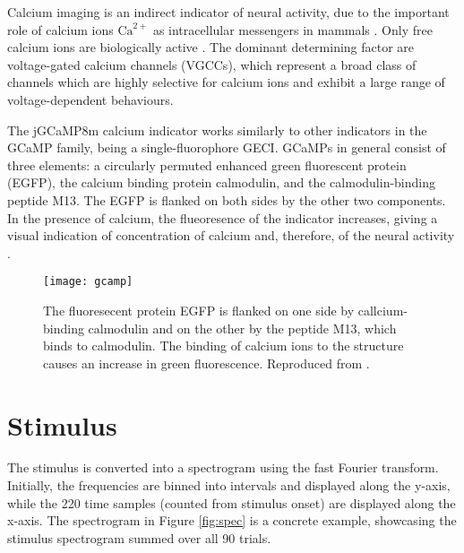 Calcium imaging is an indirect indicator of neural activity, due to the important role of calcium ions $\mathrm{Ca}^{2+}$ as intracellular messengers in mammals \parencite{grienbergerImagingCalciumNeurons2012}. Only free calcium ions are biologically active \parencite{grienbergerImagingCalciumNeurons2012}. The dominant determining factor are voltage-gated calcium channels (VGCCs), which represent a broad class of channels which are highly selective for calcium ions and exhibit a large range of voltage-dependent behaviours.

The jGCaMP8m calcium indicator works similarly to other indicators in the GCaMP family, being a single-fluorophore GECI. GCaMPs in general consist of three elements: a circularly permuted enhanced green fluorescent protein (EGFP), the calcium binding protein calmodulin, and the calmodulin-binding peptide M13. The EGFP is flanked on both sides by the other two components. In the presence of calcium, the flueoresence of the indicator increases, giving a visual indication of concentration of calcium and, therefore, of the neural activity \parencite{grienbergerImagingCalciumNeurons2012}.

\begin{figure}[ht]
	\centering
	\texttt{[image: gcamp]}
	\caption{The fluoresecent protein EGFP is flanked on one side by callcium-binding calmodulin and on the other by the peptide M13, which binds to calmodulin. The binding of calcium ions to the structure causes an increase in green fluorescence. Reproduced from \textcite{grienbergerImagingCalciumNeurons2012}.}
\end{figure}



\section{Stimulus}

The stimulus is converted into a spectrogram using the fast Fourier transform. Initially, the frequencies are binned into intervals and displayed along the y-axis, while the 220 time samples (counted from stimulus onset) are displayed along the x-axis. The spectrogram in Figure \ref{fig:spec} is a concrete example, showcasing the stimulus spectrogram summed over all 90 trials.

